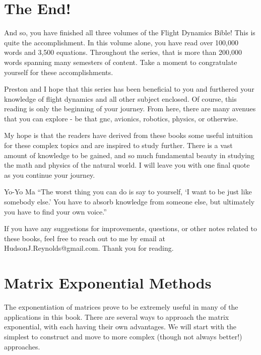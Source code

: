 \chapter*{The End!}
And so, you have finished all three volumes of the Flight Dynamics Bible! This is quite the accomplishment. In this volume alone, you have read over 100,000 words and 3,500 equations. Throughout the series, that is more than 200,000 words spanning many semesters of content. Take a moment to congratulate yourself for these accomplishments.

Preston and I hope that this series has been beneficial to you and furthered your knowledge of flight dynamics and all other subject enclosed. Of course, this reading is only the beginning of your journey. From here, there are many avenues that you can explore - be that \gls{gnc}, avionics, robotics, physics, or otherwise.

My hope is that the readers have derived from these books some useful intuition for these complex topics and are inspired to study further. There is a vast amount of knowledge to be gained, and so much fundamental beauty in studying the math and physics of the natural world. I will leave you with one final quote as you continue your journey. 

\begin{chapquote}{Yo-Yo Ma}
``The worst thing you can do is say to yourself, `I want to be just like somebody else.' You have to absorb knowledge from someone else, but ultimately you have to find your own voice.''
\end{chapquote}

If you have any suggestions for improvements, questions, or other notes related to these books, feel free to reach out to me by email at HudsonJ.Reynolds@gmail.com. Thank you for reading.

\appendix
\addappheadtotoc

\renewcommand{\chaptername}{Appendix}
\renewcommand{\chapterautorefname}{Appendix}

\chapter{Matrix Exponential Methods}\label{sec: computation of matrix exp}

The exponentiation of matrices prove to be extremely useful in many of the applications in this book. There are several ways to approach the matrix exponential, with each having their own advantages. We will start with the simplest to construct and move to more complex (though not always better!) approaches.

